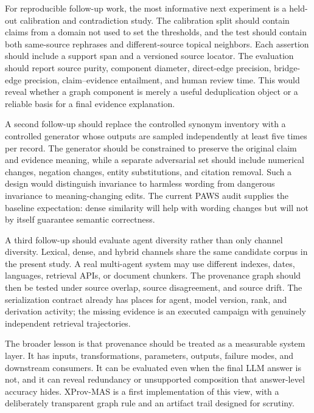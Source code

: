 \documentclass{ieeeaccess}
\begin{document}
For reproducible follow-up work, the most informative next experiment is a held-out calibration and contradiction study. The calibration split should contain claims from a domain not used to set the thresholds, and the test should contain both same-source rephrases and different-source topical neighbors. Each assertion should include a support span and a versioned source locator. The evaluation should report source purity, component diameter, direct-edge precision, bridge-edge precision, claim--evidence entailment, and human review time. This would reveal whether a graph component is merely a useful deduplication object or a reliable basis for a final evidence explanation.

A second follow-up should replace the controlled synonym inventory with a controlled generator whose outputs are sampled independently at least five times per record. The generator should be constrained to preserve the original claim and evidence meaning, while a separate adversarial set should include numerical changes, negation changes, entity substitutions, and citation removal. Such a design would distinguish invariance to harmless wording from dangerous invariance to meaning-changing edits. The current PAWS audit supplies the baseline expectation: dense similarity will help with wording changes but will not by itself guarantee semantic correctness.

A third follow-up should evaluate agent diversity rather than only channel diversity. Lexical, dense, and hybrid channels share the same candidate corpus in the present study. A real multi-agent system may use different indexes, dates, languages, retrieval APIs, or document chunkers. The provenance graph should then be tested under source overlap, source disagreement, and source drift. The serialization contract already has places for agent, model version, rank, and derivation activity; the missing evidence is an executed campaign with genuinely independent retrieval trajectories.

The broader lesson is that provenance should be treated as a measurable system layer. It has inputs, transformations, parameters, outputs, failure modes, and downstream consumers. It can be evaluated even when the final LLM answer is not, and it can reveal redundancy or unsupported composition that answer-level accuracy hides. XProv-MAS is a first implementation of this view, with a deliberately transparent graph rule and an artifact trail designed for scrutiny.

\nocite{*}


\EOD
\end{document}
